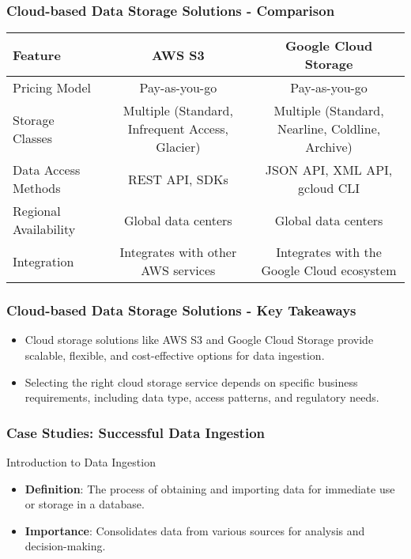 \documentclass[aspectratio=169]{beamer}
\begin{document}
\begin{frame}[fragile]
    \frametitle{Cloud-based Data Storage Solutions - Comparison}
    \begin{table}[htbp]
        \centering
        \begin{tabular}{|l|c|c|}
            \hline
            \textbf{Feature} & \textbf{AWS S3} & \textbf{Google Cloud Storage} \\
            \hline
            Pricing Model & Pay-as-you-go & Pay-as-you-go \\
            Storage Classes & Multiple (Standard, Infrequent Access, Glacier) & Multiple (Standard, Nearline, Coldline, Archive) \\
            Data Access Methods & REST API, SDKs & JSON API, XML API, gcloud CLI \\
            Regional Availability & Global data centers & Global data centers \\
            Integration & Integrates with other AWS services & Integrates with the Google Cloud ecosystem \\
            \hline
        \end{tabular}
    \end{table}
\end{frame}

\begin{frame}[fragile]
    \frametitle{Cloud-based Data Storage Solutions - Key Takeaways}
    \begin{itemize}
        \item Cloud storage solutions like AWS S3 and Google Cloud Storage provide scalable, flexible, and cost-effective options for data ingestion.
        \item Selecting the right cloud storage service depends on specific business requirements, including data type, access patterns, and regulatory needs.
    \end{itemize}
\end{frame}

\begin{frame}[fragile]
    \frametitle{Case Studies: Successful Data Ingestion}
    \begin{block}{Introduction to Data Ingestion}
        \begin{itemize}
            \item \textbf{Definition}: The process of obtaining and importing data for immediate use or storage in a database.
            \item \textbf{Importance}: Consolidates data from various sources for analysis and decision-making.
        \end{itemize}
    \end{block}
\end{frame}
\end{document}
